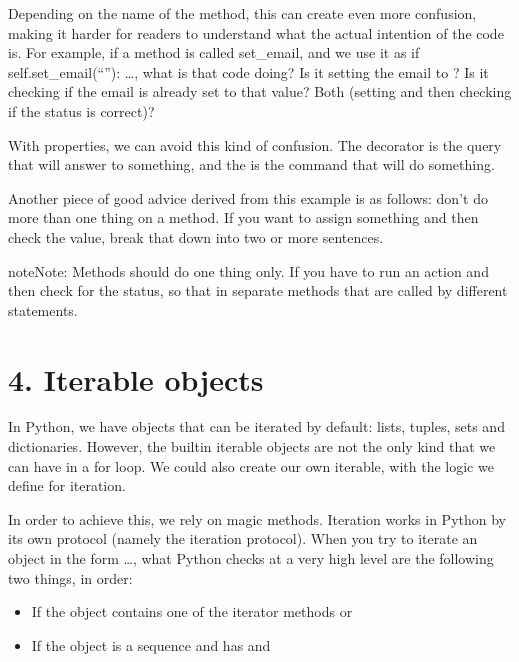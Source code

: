 \documentclass[a4paper,10pt,english]{sphinxmanual}
\begin{document}
Depending on the name of the method, this can create even more confusion, making it harder for readers to understand
what the actual intention of the code is. For example, if a method is called set\_email, and we use it as
if self.set\_email(“”): …, what is that code doing? Is it setting the email to ? Is it checking if the
email is already set to that value? Both (setting and then checking if the status is correct)?

With properties, we can avoid this kind of confusion. The  decorator is the query that will answer to
something, and the  is the command that will do something.

Another piece of good advice derived from this example is as follows: don’t do more than one thing on a method. If you
want to assign something and then check the value, break that down into two or more sentences.

\begin{sphinxadmonition}{note}{Note:}
Methods should do one thing only. If you have to run an action and then check for the status, so that in separate
methods that are called by different statements.
\end{sphinxadmonition}


\section{4. Iterable objects}
\label{\detokenize{chapters/2_pythonic_code/index:iterable-objects}}
In Python, we have objects that can be iterated by default: lists, tuples, sets and dictionaries. However, the built\sphinxhyphen{}in
iterable objects are not the only kind that we can have in a for loop. We could also create our own iterable, with the
logic we define for iteration.

In order to achieve this, we rely on magic methods. Iteration works in Python by its own protocol (namely the iteration
protocol). When you try to iterate an object in the form …, what Python checks at a very high
level are the following two things, in order:
\begin{itemize}
\item {} 
If the object contains one of the iterator methods  or 

\item {} 
If the object is a sequence and has  and 

\end{itemize}
\end{document}
